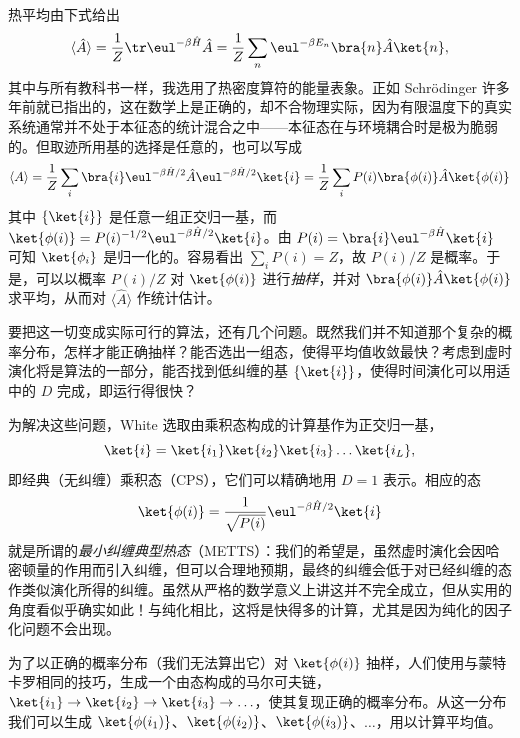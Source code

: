 热平均由下式给出
\begin{equation}
\langle \hat{A} \rangle = \frac{1}{Z} \tr \eul^{-\beta \hat{H}} \hat{A} = \frac{1}{Z} \sum_n \eul^{-\beta E_n} \bra{n} \hat{A} \ket{n} ,
\end{equation}
其中与所有教科书一样，我选用了热密度算符的能量表象。正如 Schr\"{o}dinger 许多年前就已指出的，这在数学上是正确的，却不合物理实际，因为有限温度下的真实系统通常并不处于本征态的统计混合之中——本征态在与环境耦合时是极为脆弱的。但取迹所用基的选择是任意的，也可以写成
\begin{equation}
\langle A \rangle = \frac{1}{Z} \sum_i \bra{i} \eul^{-\beta\hat{H}/2} \hat{A} \eul^{-\beta\hat{H}/2} \ket{i}
= \frac{1}{Z} \sum_i P(i) \bra{\phi(i)} \hat{A} \ket{\phi(i)}
\end{equation}
其中 $\{ \ket{i} \}$ 是任意一组正交归一基，而 $\ket{\phi(i)} = P(i)^{-1/2} \eul^{-\beta\hat{H}/2} \ket{i}$。由 $P(i) = \bra{i} \eul^{-\beta \hat{H}} \ket{i}$ 可知 $\ket{\phi_{i}}$ 是归一化的。容易看出 $\sum_i P(i) = Z$，故 $P(i)/Z$ 是概率。于是，可以以概率 $P(i)/Z$ 对 $\ket{\phi(i)}$ 进行{\em 抽样}，并对 $\bra{\phi(i)} \hat{A} \ket{\phi(i)}$ 求平均，从而对 $\langle \hat{A}\rangle$ 作统计估计。

要把这一切变成实际可行的算法，还有几个问题。既然我们并不知道那个复杂的概率分布，怎样才能正确抽样？能否选出一组态，使得平均值收敛最快？考虑到虚时演化将是算法的一部分，能否找到低纠缠的基 $\{ \ket{i} \}$，使得时间演化可以用适中的 $D$ 完成，即运行得很快？

为解决这些问题，White 选取由乘积态构成的计算基作为正交归一基，
\begin{equation}
\ket{i} = \ket{i_1}\ket{i_2}\ket{i_3} \ldots \ket{i_L} ,
\end{equation}
即经典（无纠缠）乘积态（CPS），它们可以精确地用 $D=1$ 表示。相应的态
\begin{equation}
\ket{\phi(i)} = \frac{1}{\sqrt{P(i)}} \eul^{-\beta \hat{H}/2} \ket{i}
\end{equation}
就是所谓的{\em 最小纠缠典型热态}（METTS）：我们的希望是，虽然虚时演化会因哈密顿量的作用而引入纠缠，但可以合理地预期，最终的纠缠会低于对已经纠缠的态作类似演化所得的纠缠。虽然从严格的数学意义上讲这并不完全成立，但从实用的角度看似乎确实如此！与纯化相比，这将是快得多的计算，尤其是因为纯化的因子化问题不会出现。

为了以正确的概率分布（我们无法算出它）对 $\ket{\phi(i)}$ 抽样，人们使用与蒙特卡罗相同的技巧，生成一个由态构成的马尔可夫链，
$\ket{i_1} \rightarrow \ket{i_2} \rightarrow \ket{i_3} \rightarrow \ldots$，使其复现正确的概率分布。从这一分布我们可以生成 $\ket{\phi(i_1)}$、$\ket{\phi(i_2)}$、$\ket{\phi(i_3)}$、$\ldots$，用以计算平均值。


